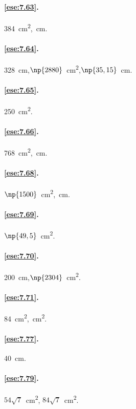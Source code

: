 \paragraph{\ref{ese:7.63}.}
384~cm\textsuperscript{2},~cm.

\paragraph{\ref{ese:7.64}.}
328~cm,\quad \(\np{2880}\)~cm\textsuperscript{2},\quad \(\np{35,15}\)~cm.

\paragraph{\ref{ese:7.65}.}
250~cm\textsuperscript{2}.

\paragraph{\ref{ese:7.66}.}
768~cm\textsuperscript{2},~cm.

\paragraph{\ref{ese:7.68}.}
\(\np{1500}\)~cm\textsuperscript{2},~cm.

\paragraph{\ref{ese:7.69}.}
\(\np{49,5}\)~cm\textsuperscript{2}.

\paragraph{\ref{ese:7.70}.}
200~cm,\quad \(\np{2304}\)~cm\textsuperscript{2}.

\paragraph{\ref{ese:7.71}.}
84~cm\textsuperscript{2},~cm\textsuperscript{2}.

\paragraph{\ref{ese:7.77}.}
40~cm.

\paragraph{\ref{ese:7.79}.}
\(54\sqrt{7}\)~cm\textsuperscript{2},\quad 
\(84\sqrt{7}\)~cm\textsuperscript{2}.

